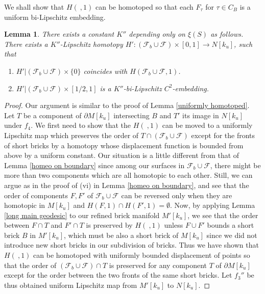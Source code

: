 \documentclass{amsart}
\newtheorem{lemma}[theorem]{Lemma}
\theoremstyle{definition}
\numberwithin{figure}{section}
\numberwithin{equation}{section}
\begin{document}
We shall show that $H(\ ,1)$ can be homotoped so that each $F_\tau$ for $\tau \in C_B$ is a  uniform bi-Lipschitz embedding.
\begin{lemma}
\label{embedding cuts}
There exists a constant $K''$ depending only on $\xi(S)$ as follows.
There exists a $K''$-Lipschitz homotopy $H': (\mathcal F_b \cup \mathcal F) \times [0,1] \rightarrow N[k_u]$, such that 
\begin{enumerate}[\rm(i)]
\item $H'|(\mathcal F_b \cup \mathcal F) \times \{0\}$ coincides with $H(\mathcal F_b \cup \mathcal F,1)$.
\item $H' | (\mathcal F_b \cup \mathcal F) \times [1/2,1]$ is a $K''$-bi-Lipschitz $C^2$-embedding.
\end{enumerate}
\end{lemma}
\begin{proof}
Our argument is similar to the proof of Lemma \ref{uniformly homotoped}.
Let $T$ be a component of $\partial M[k_u]$ intersecting $B$ and $T'$ its image in $N[k_u]$ under $f_4$.
We first need to show that the $H(\ ,1)$ can be moved to a uniformly Lipschitz map which preserves the order of $T \cap (\mathcal F_b \cup \mathcal F)$  except for the fronts of short bricks by a homotopy whose displacement function is bounded from above by a uniform constant.
Our situation is a little different from that of Lemma \ref{homeo on boundary} since among our surfaces in $\mathcal F_b \cup \mathcal F$, there might be more than two components which are all homotopic to each other.
Still, we can argue as in the proof of (vi) in Lemma \ref{homeo on boundary}, and see that the order of components $F, F'$ of $\mathcal F_b \cup \mathcal F$ can be reversed only when they are homotopic in $M[k_u]$ and  $H(F,1)\cap H(F',1) =\emptyset$.
Now, by applying Lemma \ref{long main geodesic} to our refined brick manifold $M'[k_u]$, we see that the order between $F \cap T$ and $F' \cap T$ is preserved by $H(\ ,1)$ unless $F\cup F'$ bounds a short brick $B$ in $M'[k_u]$, which must be also a short brick of $M[k_u]$ since we did not introduce new short bricks in our subdivision of bricks.
Thus we have shown that $H(\ , 1)$ can be homotoped with  uniformly bounded displacement of points so that the order of $(\mathcal F_b \cup \mathcal F) \cap T$ is preserved for any component $T$ of $\partial M[k_u]$ except for the order between the two fronts of the same short bricks.
Let $f_3''$ be thus obtained uniform Lipschitz map from $M'[k_u]$ to $N[k_u]$.


\end{proof}
\end{document}
